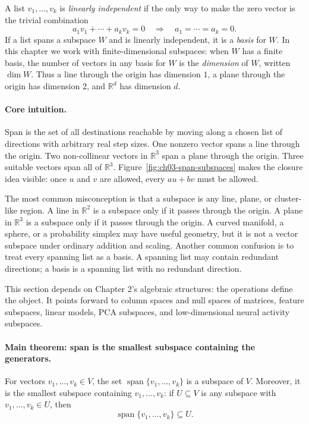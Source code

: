 A list \(v_1,\dots,v_k\) is \emph{linearly independent} if the only way to make the zero vector is the trivial combination
\[
a_1v_1+\cdots+a_kv_k=0
\quad\Longrightarrow\quad
a_1=\cdots=a_k=0.
\]
If a list spans a subspace \(W\) and is linearly independent, it is a \emph{basis} for \(W\). In this chapter we work with finite-dimensional subspaces: when \(W\) has a finite basis, the number of vectors in any basis for \(W\) is the \emph{dimension} of \(W\), written \(\dim W\). Thus a line through the origin has dimension \(1\), a plane through the origin has dimension \(2\), and \(\mathbb{R}^d\) has dimension \(d\).

\paragraph{Core intuition.}
Span is the set of all destinations reachable by moving along a chosen list of directions with arbitrary real step sizes. One nonzero vector spans a line through the origin. Two non-collinear vectors in \(\mathbb{R}^3\) span a plane through the origin. Three suitable vectors span all of \(\mathbb{R}^3\). Figure~\ref{fig:ch03-span-subspaces} makes the closure idea visible: once \(u\) and \(v\) are allowed, every \(au+bv\) must be allowed.

The most common misconception is that a subspace is any line, plane, or cluster-like region. A line in \(\mathbb{R}^2\) is a subspace only if it passes through the origin. A plane in \(\mathbb{R}^3\) is a subspace only if it passes through the origin. A curved manifold, a sphere, or a probability simplex may have useful geometry, but it is not a vector subspace under ordinary addition and scaling. Another common confusion is to treat every spanning list as a basis. A spanning list may contain redundant directions; a basis is a spanning list with no redundant direction.

This section depends on Chapter 2's algebraic structures: the operations define the object. It points forward to column spaces and null spaces of matrices, feature subspaces, linear models, PCA subspaces, and low-dimensional neural activity subspaces.

\paragraph{Main theorem: span is the smallest subspace containing the generators.}
For vectors \(v_1,\dots,v_k\in V\), the set \(\operatorname{span}\{v_1,\dots,v_k\}\) is a subspace of \(V\). Moreover, it is the smallest subspace containing \(v_1,\dots,v_k\): if \(U\subseteq V\) is any subspace with \(v_1,\dots,v_k\in U\), then
\[
\operatorname{span}\{v_1,\dots,v_k\}\subseteq U.
\]

